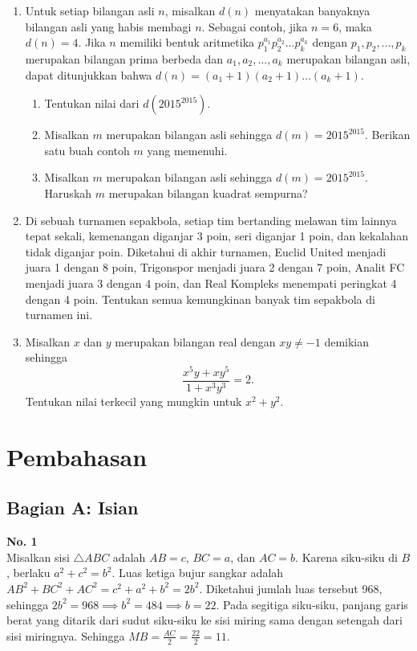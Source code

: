 \documentclass[11pt, a4paper]{article}
\begin{document}
\begin{enumerate}[label=\textbf{No. \arabic*}, leftmargin=*]
    \item Untuk setiap bilangan asli $n$, misalkan $d(n)$ menyatakan banyaknya bilangan asli yang habis membagi $n$. Sebagai contoh, jika $n = 6$, maka $d(n) = 4$. Jika $n$ memiliki bentuk aritmetika $p_1^{a_1} p_2^{a_2} \dots p_k^{a_k}$ dengan $p_1, p_2, \dots, p_k$ merupakan bilangan prima berbeda dan $a_1, a_2, \dots, a_k$ merupakan bilangan asli, dapat ditunjukkan bahwa $d(n) = (a_1 + 1)(a_2 + 1) \dots (a_k + 1)$.
    \begin{enumerate}[label=\arabic*.]
        \item Tentukan nilai dari $d(2015^{2015})$.
        \item Misalkan $m$ merupakan bilangan asli sehingga $d(m) = 2015^{2015}$. Berikan satu buah contoh $m$ yang memenuhi.
        \item Misalkan $m$ merupakan bilangan asli sehingga $d(m) = 2015^{2015}$. Haruskah $m$ merupakan bilangan kuadrat sempurna?
    \end{enumerate}

    \item Di sebuah turnamen sepakbola, setiap tim bertanding melawan tim lainnya tepat sekali, kemenangan diganjar 3 poin, seri diganjar 1 poin, dan kekalahan tidak diganjar poin. Diketahui di akhir turnamen, Euclid United menjadi juara 1 dengan 8 poin, Trigonspor menjadi juara 2 dengan 7 poin, Analit FC menjadi juara 3 dengan 4 poin, dan Real Kompleks menempati peringkat 4 dengan 4 poin. Tentukan semua kemungkinan banyak tim sepakbola di turnamen ini.

    \item Misalkan $x$ dan $y$ merupakan bilangan real dengan $xy \neq -1$ demikian sehingga
    \[ \frac{x^5y + xy^5}{1 + x^3y^3} = 2. \]
    Tentukan nilai terkecil yang mungkin untuk $x^2 + y^2$.
\end{enumerate}

\newpage
\section*{Pembahasan}

\subsection*{Bagian A: Isian}

\textbf{No. 1}\\
Misalkan sisi $\triangle ABC$ adalah $AB = c$, $BC = a$, dan $AC = b$. Karena siku-siku di $B$, berlaku $a^2 + c^2 = b^2$.
Luas ketiga bujur sangkar adalah $AB^2 + BC^2 + AC^2 = c^2 + a^2 + b^2 = 2b^2$.
Diketahui jumlah luas tersebut 968, sehingga $2b^2 = 968 \implies b^2 = 484 \implies b = 22$.
Pada segitiga siku-siku, panjang garis berat yang ditarik dari sudut siku-siku ke sisi miring sama dengan setengah dari sisi miringnya. Sehingga $MB = \frac{AC}{2} = \frac{22}{2} = 11$.
\end{document}
